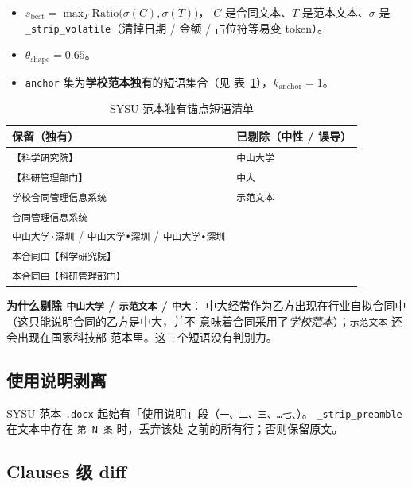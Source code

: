\documentclass[11pt,a4paper]{article}
\begin{document}
\begin{itemize}[leftmargin=1.4em,itemsep=1pt]
  \item $s_\text{best}=\max_T \text{Ratio}\bigl(\sigma(C),\sigma(T)\bigr)$，
    $C$ 是合同文本、$T$ 是范本文本、$\sigma$ 是
    \texttt{\_strip\_volatile}（清掉日期 / 金额 / 占位符等易变 token）。
  \item $\theta_\text{shape}=0.65$。
  \item \texttt{anchor} 集为\textbf{学校范本独有}的短语集合（见
    表~\ref{tab:anchors}），$k_\text{anchor}=1$。
\end{itemize}

\begin{table}[h]
\centering
\caption{SYSU 范本独有锚点短语清单}\label{tab:anchors}
\begin{tabular}{p{8.0cm} p{6.0cm}}
\toprule
\textbf{保留（独有）} & \textbf{已剔除（中性 / 误导）} \\ \midrule
\texttt{【科学研究院】} & \texttt{中山大学} \\
\texttt{【科研管理部门】} & \texttt{中大} \\
\texttt{学校合同管理信息系统} & \texttt{示范文本} \\
\texttt{合同管理信息系统} & \\
\texttt{中山大学·深圳} / \texttt{中山大学•深圳} / \texttt{中山大学∙深圳} & \\
\texttt{本合同由【科学研究院】} & \\
\texttt{本合同由【科研管理部门】} & \\
\bottomrule
\end{tabular}
\end{table}

\textbf{为什么剔除 \texttt{中山大学} / \texttt{示范文本} / \texttt{中大}}：
中大经常作为乙方出现在行业自拟合同中（这只能说明合同的乙方是中大，并不
意味着合同采用了\emph{学校范本}）；\texttt{示范文本} 还会出现在国家科技部
范本里。这三个短语没有判别力。

\subsection{使用说明剥离}

SYSU 范本 \texttt{.docx} 起始有「使用说明」段（\texttt{一、二、三、…七、}）。
\texttt{\_strip\_preamble} 在文本中存在 \texttt{第 N 条} 时，丢弃该处
之前的所有行；否则保留原文。

\subsection{Clauses 级 diff}
\end{document}
